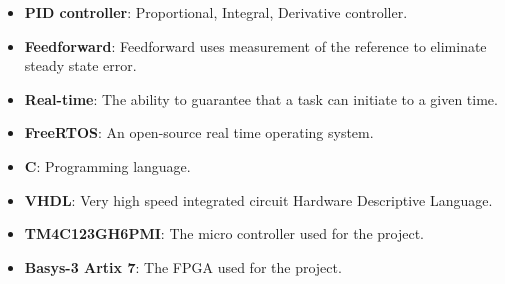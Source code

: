 \documentclass[../../main.tex]{subfiles}
\begin{document}
\begin{itemize}
    \item \textbf{PID controller}: Proportional, Integral, Derivative controller.
    \item \textbf{Feedforward}: Feedforward uses measurement of the reference to eliminate steady state error.
    \item \textbf{Real-time}: The ability to guarantee that a task can initiate to a given time.
    \item \textbf{FreeRTOS}: An open-source real time operating system.
    \item \textbf{C}: Programming language. 
    \item \textbf{VHDL}: Very high speed integrated circuit Hardware Descriptive Language.
    
    \item \textbf{TM4C123GH6PMI}: The micro controller used for the project.
    \item \textbf{Basys-3 Artix 7}: The FPGA used for the project.
     
\end{itemize}
\end{document}
